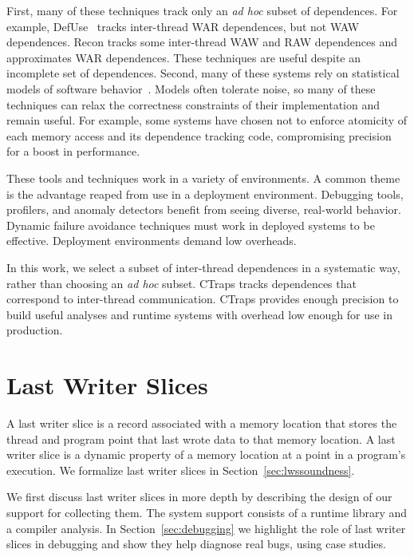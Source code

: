 \documentclass[preprint,9pt]{sigplanconf}
\newcommand{\ctraps}{CTraps\xspace}
\begin{document}
First, many of these techniques track only an {\em ad hoc} subset of
dependences.  For example, DefUse~\cite{defuse} tracks inter-thread WAR
dependences, but not WAW dependences.  Recon tracks some inter-thread WAW and
RAW dependences and approximates WAR dependences.  These techniques are useful
despite an incomplete set of dependences.  Second, many of these systems rely
on statistical models of software
behavior~\cite{avio,cci,defuse,recon,bugaboo,falcon,dmtracker,aviso,threadcriticality,schedpredictionmodel}.
Models often tolerate noise, so many of these techniques can relax the
correctness constraints of their implementation and remain useful.  For
example, some systems have chosen not to enforce atomicity of each memory
access and its dependence tracking code, compromising precision for a boost in
performance.

These tools and techniques work in a variety of environments.  A common theme
is the advantage reaped from use in a deployment environment.  Debugging tools,
profilers, and anomaly detectors benefit from seeing diverse, real-world
behavior.  Dynamic failure avoidance techniques must work in deployed systems
to be effective.  Deployment environments demand low overheads.  

In this work, we select a subset of inter-thread dependences in a systematic
way, rather than choosing an {\em ad hoc} subset.  \ctraps tracks dependences
that correspond to inter-thread communication.  \ctraps provides enough
precision to build useful analyses and runtime systems with overhead low enough
for use in production.



\section{Last Writer Slices}
\label{sec:lastwriterslices}

A last writer slice is a record associated with a memory location that stores
the thread and program point that last wrote data to that memory location.  A
last writer slice is a dynamic property of a memory location at a point in a
program's execution.   We formalize last writer slices in
Section~\ref{sec:lwssoundness}. 

We first discuss last writer slices in more depth by describing the design of
our support for collecting them.  The system support consists of a runtime
library and a compiler analysis.  In Section~\ref{sec:debugging} we highlight
the role of last writer slices in debugging and show they help diagnose real
bugs, using case studies.
\end{document}
